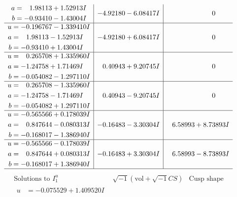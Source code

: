 \documentclass[1p]{elsarticle_modified}
\theoremstyle{definition}
\newcommand{\I}{\sqrt{-1}}
\begin{document}
$$\begin{array}{c|c|c}
\begin{aligned}
a &= \phantom{-}1.98113 + 1.52913 I \\
b &= -0.93410 - 1.43004 I\end{aligned}
 & -4.92180 - 6.08417 I & \phantom{-0.000000 } 0 \\ \hline\begin{aligned}
u &= -0.196767 - 1.339410 I \\
a &= \phantom{-}1.98113 - 1.52913 I \\
b &= -0.93410 + 1.43004 I\end{aligned}
 & -4.92180 + 6.08417 I & \phantom{-0.000000 } 0 \\ \hline\begin{aligned}
u &= \phantom{-}0.265708 + 1.335960 I \\
a &= -1.24758 + 1.71469 I \\
b &= -0.054082 - 1.297110 I\end{aligned}
 & \phantom{-}0.40943 + 9.20745 I & \phantom{-0.000000 } 0 \\ \hline\begin{aligned}
u &= \phantom{-}0.265708 - 1.335960 I \\
a &= -1.24758 - 1.71469 I \\
b &= -0.054082 + 1.297110 I\end{aligned}
 & \phantom{-}0.40943 - 9.20745 I & \phantom{-0.000000 } 0 \\ \hline\begin{aligned}
u &= -0.565566 + 0.178039 I \\
a &= \phantom{-}0.847644 - 0.080313 I \\
b &= -0.168017 - 1.386940 I\end{aligned}
 & -0.16483 - 3.30304 I & \phantom{-}6.58993 + 8.73893 I \\ \hline\begin{aligned}
u &= -0.565566 - 0.178039 I \\
a &= \phantom{-}0.847644 + 0.080313 I \\
b &= -0.168017 + 1.386940 I\end{aligned}
 & -0.16483 + 3.30304 I & \phantom{-}6.58993 - 8.73893 I\\
 \hline 
 \end{array}$$\newpage$$\begin{array}{c|c|c}  
\text{Solutions to }I^u_{1}& \I (\text{vol} + \sqrt{-1}CS) & \text{Cusp shape}\\
 \hline 
\begin{aligned}
u &= -0.075529 + 1.409520 I \\

\end{aligned}
\end{array}$$
\end{document}
